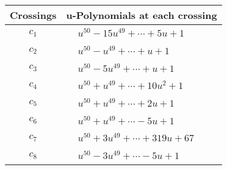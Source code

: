\documentclass[1p]{elsarticle_modified}
\theoremstyle{definition}
\begin{document}
\begin{tabular}{m{50pt}|m{274pt}}
Crossings & \hspace{64pt}u-Polynomials at each crossing \\
\hline $$\begin{aligned}c_{1}\end{aligned}$$&$\begin{aligned}
&u^{50}-15 u^{49}+\cdots+5 u+1
\end{aligned}$\\
\hline $$\begin{aligned}c_{2}\end{aligned}$$&$\begin{aligned}
&u^{50}- u^{49}+\cdots+u+1
\end{aligned}$\\
\hline $$\begin{aligned}c_{3}\end{aligned}$$&$\begin{aligned}
&u^{50}-5 u^{49}+\cdots+u+1
\end{aligned}$\\
\hline $$\begin{aligned}c_{4}\end{aligned}$$&$\begin{aligned}
&u^{50}+u^{49}+\cdots+10 u^2+1
\end{aligned}$\\
\hline $$\begin{aligned}c_{5}\end{aligned}$$&$\begin{aligned}
&u^{50}+u^{49}+\cdots+2 u+1
\end{aligned}$\\
\hline $$\begin{aligned}c_{6}\end{aligned}$$&$\begin{aligned}
&u^{50}+u^{49}+\cdots-5 u+1
\end{aligned}$\\
\hline $$\begin{aligned}c_{7}\end{aligned}$$&$\begin{aligned}
&u^{50}+3 u^{49}+\cdots+319 u+67
\end{aligned}$\\
\hline $$\begin{aligned}c_{8}\end{aligned}$$&$\begin{aligned}
&u^{50}-3 u^{49}+\cdots-5 u+1
\end{aligned}$\\

\end{tabular}
\end{document}
